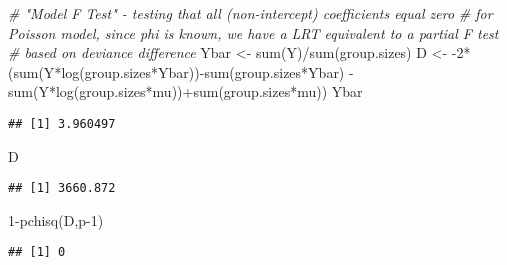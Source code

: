 \documentclass[
]{book}
\newenvironment{Shaded}{\begin{snugshade}}{\end{snugshade}}
\newcommand{\CommentTok}[1]{\textcolor[rgb]{0.56,0.35,0.01}{\textit{#1}}}
\newcommand{\DecValTok}[1]{\textcolor[rgb]{0.00,0.00,0.81}{#1}}
\newcommand{\FunctionTok}[1]{\textcolor[rgb]{0.00,0.00,0.00}{#1}}
\newcommand{\NormalTok}[1]{#1}
\newcommand{\OtherTok}[1]{\textcolor[rgb]{0.56,0.35,0.01}{#1}}
\newcommand{\SpecialCharTok}[1]{\textcolor[rgb]{0.00,0.00,0.00}{#1}}
\begin{document}
\begin{Shaded}
\begin{Highlighting}[]
\CommentTok{\# "Model F Test" {-} testing that all (non{-}intercept) coefficients equal zero}
\CommentTok{\# for Poisson model, since phi is known, we have a LRT equivalent to a partial F test}
\CommentTok{\# based on deviance difference}
\NormalTok{Ybar }\OtherTok{\textless{}{-}} \FunctionTok{sum}\NormalTok{(Y)}\SpecialCharTok{/}\FunctionTok{sum}\NormalTok{(group.sizes)}
\NormalTok{D }\OtherTok{\textless{}{-}} \SpecialCharTok{{-}}\DecValTok{2}\SpecialCharTok{*}\NormalTok{(}\FunctionTok{sum}\NormalTok{(Y}\SpecialCharTok{*}\FunctionTok{log}\NormalTok{(group.sizes}\SpecialCharTok{*}\NormalTok{Ybar))}\SpecialCharTok{{-}}\FunctionTok{sum}\NormalTok{(group.sizes}\SpecialCharTok{*}\NormalTok{Ybar) }\SpecialCharTok{{-}} \FunctionTok{sum}\NormalTok{(Y}\SpecialCharTok{*}\FunctionTok{log}\NormalTok{(group.sizes}\SpecialCharTok{*}\NormalTok{mu))}\SpecialCharTok{+}\FunctionTok{sum}\NormalTok{(group.sizes}\SpecialCharTok{*}\NormalTok{mu))}
\NormalTok{Ybar}
\end{Highlighting}
\end{Shaded}

\begin{verbatim}
## [1] 3.960497
\end{verbatim}

\begin{Shaded}
\begin{Highlighting}[]
\NormalTok{D}
\end{Highlighting}
\end{Shaded}

\begin{verbatim}
## [1] 3660.872
\end{verbatim}

\begin{Shaded}
\begin{Highlighting}[]
\DecValTok{1}\SpecialCharTok{{-}}\FunctionTok{pchisq}\NormalTok{(D,p}\DecValTok{{-}1}\NormalTok{)}
\end{Highlighting}
\end{Shaded}

\begin{verbatim}
## [1] 0
\end{verbatim}
\end{document}
